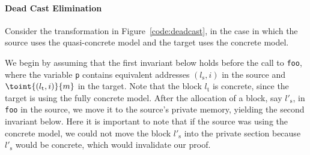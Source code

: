 
\paragraph{Dead Cast Elimination}

Consider the transformation in Figure~\ref{code:deadcast}, in the case in which
the source uses the quasi-concrete model and the target uses the
concrete model.

We begin by assuming that the first invariant below holds before the call to
\texttt{foo}, where the variable \texttt{p} contains equivalent
addresses $(l_\text{s},i)$ in the source and $\toint{(l_\text{t},i)}{m}$ in the target.
Note that the block $l_\text{t}$ is concrete, since the target is using
the fully concrete model. After the allocation of a block, say
$l'_\text{s}$, in \texttt{foo} in the source, we move it to the source's
private memory, yielding the second invariant below.  Here it is important
to note that if the source was using the concrete model, we could not move
the block $l'_\text{s}$ into the private section because $l'_\text{s}$
would be concrete, which would invalidate our proof.

